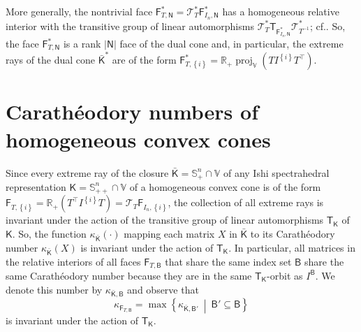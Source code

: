 \documentclass[oneside]{amsart}
\theoremstyle{plain}
\theoremstyle{definition}
\theoremstyle{remark}
\numberwithin{equation}{section}
\DeclareMathOperator{\proj}{proj}
\begin{document}
More generally, the nontrivial face $\mathsf{F}^{*}_{T,\mathsf{N}} =
\mathcal{T}^{*}_{T} \mathsf{F}^{*}_{I_{n},\mathsf{N}}$ has a homogeneous
relative interior with the transitive group of linear automorphisms
$\mathcal{T}^{*}_{T} \mathsf{T}_{\mathsf{F}^{*}_{I_{n},\mathsf{N}}}
\mathcal{T}^{*}_{T^{-1}}$; cf.\@ \cite[Theorem~3.11]{GouItoLou25}. So, the
face $\mathsf{F}^{*}_{T,\mathsf{N}}$ is a rank $\lvert \mathsf{N} \rvert$
face of the dual cone and, in particular, the extreme rays of the dual cone
$\bar{\mathsf{K}}^{*}$ are of the form $\mathsf{F}^{*}_{T,\left\{i\right\}}
= \mathbb{R}_+ \proj_{\mathbb{V}}\left( T I^{\left\{i\right\}} T^{\top}
\right)$.

\section{Carath\'eodory numbers of homogeneous convex cones}
\label{section:Caratheodorynumbers}

Since every extreme ray of the closure $\bar{\mathsf{K}} =
\mathbb{S}^{n}_{+} \cap \mathbb{V}$ of any Ishi spectrahedral
representation $\mathsf{K} = \mathbb{S}^{n}_{++} \cap \mathbb{V}$ of a
homogeneous convex cone is of the form $\mathsf{F}_{T,\left\{i\right\}} =
\mathbb{R}_+ (T^{\top} I^{\left\{i\right\}} T) = \mathcal{T}_{T}
\mathsf{F}_{I_{n},\left\{i\right\}}$, the collection of all extreme rays is
invariant under the action of the transitive group of linear automorphisms
$\mathsf{T}_{\mathsf{K}}$ of $\mathsf{K}$. So, the function
$\kappa_{\bar{\mathsf{K}}}(\cdot)$ mapping each matrix $X$ in
$\bar{\mathsf{K}}$ to its Carath\'eodory number
$\kappa_{\bar{\mathsf{K}}}(X)$ is invariant under the action of
$\mathsf{T}_{\mathsf{K}}$. In particular, all matrices in the relative
interiors of all faces $\mathsf{F}_{T,\mathsf{B}}$ that share the same
index set $\mathsf{B}$ share the same Carath\'eodory number because they
are in the same $\mathsf{T}_{\mathsf{K}}$-orbit as $I^{\mathsf{B}}$. We
denote this number by $\kappa_{\bar{\mathsf{K}},\mathsf{B}}$ and observe
that
\[
\kappa_{\mathsf{F}_{T,\mathsf{B}}} = \max
\left\{\kappa_{\bar{\mathsf{K}},\mathsf{B}'}\ \middle|\ \mathsf{B}'
\subseteq \mathsf{B}\right\}
\]
is invariant under the action of $\mathsf{T}_{\mathsf{K}}$.
\end{document}
